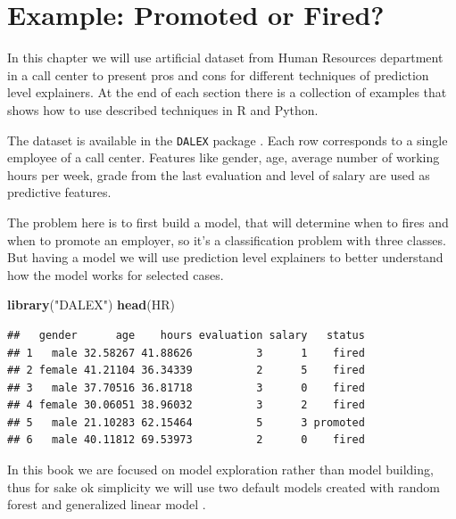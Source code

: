 \documentclass[]{book}
\newenvironment{Shaded}{\begin{snugshade}}{\end{snugshade}}
\newcommand{\KeywordTok}[1]{\textcolor[rgb]{0.13,0.29,0.53}{\textbf{#1}}}
\newcommand{\NormalTok}[1]{#1}
\newcommand{\StringTok}[1]{\textcolor[rgb]{0.31,0.60,0.02}{#1}}
\theoremstyle{definition}
\theoremstyle{definition}
\theoremstyle{definition}
\theoremstyle{remark}
\begin{document}
\hypertarget{example-promoted-or-fired}{%
\section{Example: Promoted or Fired?}\label{example-promoted-or-fired}}

In this chapter we will use artificial dataset from Human Resources
department in a call center to present pros and cons for different
techniques of prediction level explainers. At the end of each section
there is a collection of examples that shows how to use described
techniques in R and Python.

The dataset is available in the \texttt{DALEX} package \citep{R-DALEX}.
Each row corresponds to a single employee of a call center. Features
like gender, age, average number of working hours per week, grade from
the last evaluation and level of salary are used as predictive features.

The problem here is to first build a model, that will determine when to
fires and when to promote an employer, so it's a classification problem
with three classes. But having a model we will use prediction level
explainers to better understand how the model works for selected cases.

\begin{Shaded}
\begin{Highlighting}[]
\KeywordTok{library}\NormalTok{(}\StringTok{"DALEX"}\NormalTok{)}
\KeywordTok{head}\NormalTok{(HR)}
\end{Highlighting}
\end{Shaded}

\begin{verbatim}
##   gender      age    hours evaluation salary   status
## 1   male 32.58267 41.88626          3      1    fired
## 2 female 41.21104 36.34339          2      5    fired
## 3   male 37.70516 36.81718          3      0    fired
## 4 female 30.06051 38.96032          3      2    fired
## 5   male 21.10283 62.15464          5      3 promoted
## 6   male 40.11812 69.53973          2      0    fired
\end{verbatim}

In this book we are focused on model exploration rather than model
building, thus for sake ok simplicity we will use two default models
created with random forest \citep{R-randomForest} and generalized linear
model \citep{R-nnet}.
\end{document}
